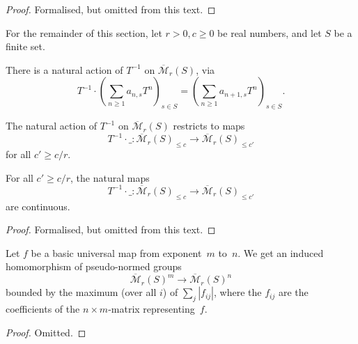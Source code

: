 \begin{proof}
  \leanok
  Formalised, but omitted from this text.
\end{proof}

For the remainder of this section,
let $r > 0, c \ge 0$ be real numbers,
and let $S$ be a finite set.

\begin{definition}
  \label{Mbar_Tinv}
  \leanok
  There is a natural action of $T^{-1}$ on $\overline{\mathcal M}_r(S)$, via
  \[
    T^{-1} \cdot
    \left( \sum_{n \ge 1} a_{n,s} T^n \right)_{s \in S} =
    \left( \sum_{n \ge 1} a_{n+1,s} T^n \right)_{s \in S}.
  \]
\end{definition}

\begin{definition}
  \label{Mbar_le_Tinv}
  \leanok
  The natural action of $T^{-1}$ on $\overline{\mathcal M}_r(S)$ restricts to maps
  \[
    T^{-1} \cdot \_ \colon
    \overline{\mathcal M}_r(S)_{\le c} \to
    \overline{\mathcal M}_r(S)_{\le c'}
  \]
  for all $c' \ge c/r$.
\end{definition}

\begin{lemma}
  \label{Mbar_le_Tinv_ctu}
  \leanok
  For all $c' \ge c/r$, the natural maps
  \[
    T^{-1} \cdot \_ \colon
    \overline{\mathcal M}_r(S)_{\le c} \to
    \overline{\mathcal M}_r(S)_{\le c'}
  \]
  are continuous.
\end{lemma}

\begin{proof}
  \leanok
  Formalised, but omitted from this text.
\end{proof}

\begin{lemma}
  \label{basic_eval_Mbar}
  \leanok
  Let $f$ be a basic universal map from exponent~$m$ to~$n$.
  We get an induced homomorphism of pseudo-normed groups
  \[
    \overline{\mathcal M}_r(S)^m \to \overline{\mathcal M}_r(S)^n
  \]
  bounded by the maximum (over all $i$) of $\sum_j |f_{ij}|$,
  where the $f_{ij}$ are the coefficients of the $n \times m$-matrix representing~$f$.
\end{lemma}

\begin{proof}
  \leanok
  Omitted.
\end{proof}

